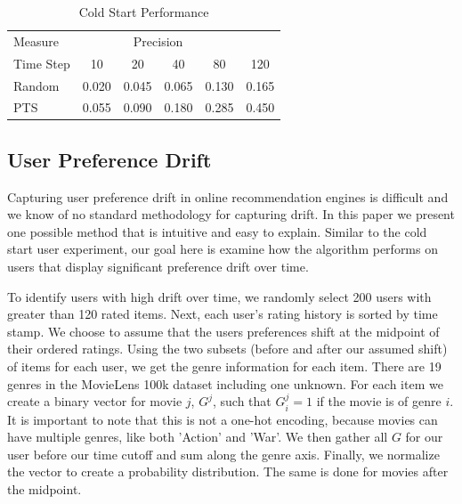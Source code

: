 \documentclass{article}
\begin{document}
\begin{table}[ht]
\caption{Cold Start Performance}
\label{sample-table}
\vskip 0.15in
\begin{center}
\begin{small}
\begin{sc}
\begin{tabular}{lccccc}
\toprule
Measure & \multicolumn{4}{c}{Precision}\\
Time Step  & 10     & 20     & 40   & 80    & 120 \\
\midrule
Random  &  0.020 & 0.045 & 0.065 & 0.130 & 0.165 \\
PTS     &  0.055 & 0.090 & 0.180 & 0.285 & 0.450 \\
\bottomrule
\end{tabular}
\end{sc}
\end{small}
\end{center}
\vskip -0.1in
\end{table}

\subsection{User Preference Drift}

Capturing user preference drift in online recommendation engines is difficult and we know of no standard methodology for capturing drift. In this paper we present one possible method that is intuitive and easy to explain. Similar to the cold start user experiment, our goal here is examine how the algorithm performs on users that display significant preference drift over time.  

To identify users with high drift over time, we randomly select 200 users with greater than 120 rated items. Next, each user's rating history is sorted by time stamp. We choose to assume that the users preferences shift at the midpoint of their ordered ratings. Using the two subsets (before and after our assumed shift) of items for each user, we get the genre information for each item. There are 19 genres in the MovieLens 100k dataset including one unknown. For each item we create a binary vector for movie $j$, $G^j$, such that $G^j_i = 1$ if the movie is of genre $i$. It is important to note that this is not a one-hot encoding, because movies can have multiple genres, like both 'Action' and 'War'. We then gather all $G$ for our user before our time cutoff and sum along the genre axis. Finally, we normalize the vector to create a probability distribution. The same is done for movies after the midpoint.
\end{document}
